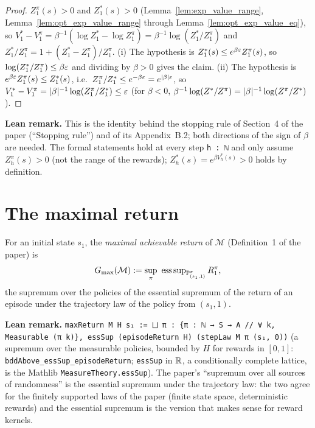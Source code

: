 \begin{proof}
\leanok
$Z^\pi_1(s) > 0$ and $Z^*_1(s) > 0$ (Lemma~\ref{lem:exp_value_range},
Lemma~\ref{lem:opt_exp_value_range} through Lemma~\ref{lem:opt_exp_value_eq}), so
$V^*_1 - V^\pi_1 = \beta^{-1}(\log Z^*_1 - \log Z^\pi_1) = \beta^{-1}\log(Z^*_1/Z^\pi_1)$ and
$Z^*_1/Z^\pi_1 = 1 + (Z^*_1 - Z^\pi_1)/Z^\pi_1$. (i) The hypothesis is $Z^*_1(s) \le e^{\beta\varepsilon} Z^\pi_1(s)$,
so $\log(Z^*_1/Z^\pi_1) \le \beta\varepsilon$ and dividing by $\beta > 0$ gives the claim. (ii) The
hypothesis is $e^{\beta\varepsilon} Z^\pi_1(s) \le Z^*_1(s)$, i.e.\ $Z^\pi_1/Z^*_1 \le e^{-\beta\varepsilon} = e^{\lvert \beta \rvert\varepsilon}$,
so $V^*_1 - V^\pi_1 = \lvert \beta \rvert^{-1}\log(Z^\pi_1/Z^*_1) \le \varepsilon$ (for $\beta < 0$,
$\beta^{-1}\log(Z^*/Z^\pi) = \lvert \beta \rvert^{-1}\log(Z^\pi/Z^*)$).
\end{proof}

\textbf{Lean remark.} This is the identity behind the stopping rule of Section~4 of the
paper (``Stopping rule'') and of its Appendix~B.2; both directions of the sign of $\beta$ are
needed. The formal statements hold at every step \texttt{h : ℕ} and only assume
$Z^\pi_h(s) > 0$ (not the range of the rewards); $Z^*_h(s) = e^{\beta V^*_h(s)} > 0$ holds by
definition.

\section{The maximal return}
\label{sec:mdp_gmax}

\begin{definition}\label{def:gmax}
\leanok
{}
For an initial state $s_1$, the \emph{maximal achievable return} of $\mathcal M$ (Definition~1 of
the paper) is
\[
  \Gmax(\mathcal M) := \sup_{\pi}\ \operatorname{ess\,sup}_{\Prob^\pi_{(s_1, 1)}} R^\pi_1 ,
\]
the supremum over the policies of the essential supremum of the return of an episode under the
trajectory law of the policy from $(s_1, 1)$.
\end{definition}

\textbf{Lean remark.} \texttt{maxReturn M H s₁ := ⨆ π : \{π : ℕ → S → A // ∀ k, Measurable (π k)\}, essSup (episodeReturn H) (stepLaw M π (s₁, 0))}
(a supremum over the measurable policies, bounded by $H$ for rewards in $[0, 1]$:
\texttt{bddAbove\_essSup\_episodeReturn}; \texttt{essSup} in $\mathbb{R}$, a conditionally complete
lattice, is the Mathlib \texttt{MeasureTheory.essSup}). The paper's ``supremum over all sources of
randomness'' is the essential supremum under the trajectory law: the two agree for the
finitely supported laws of the paper (finite state space, deterministic rewards) and the
essential supremum is the version that makes sense for reward kernels.

